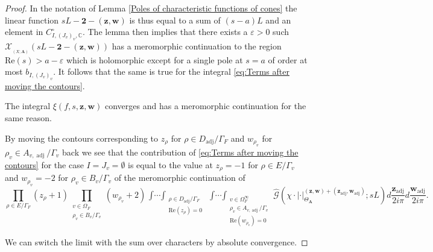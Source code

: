 \documentclass[10pt,a4paper]{amsart}
\DeclareMathOperator{\Eff}{\overline{Eff}}
\DeclareMathOperator{\adj}{adj}
\newcommand{\C}{\mathbb{C}}
\renewcommand{\Re}{\mathrm{Re}}
\begin{document}
\begin{proof}
 	In the notation of Lemma \ref{Poles of characteristic functions of cones} the linear function $s L - \mathbf{2} - (\bm{z}, \bm{w})$ is thus equal to a sum of $(s - a)L$ and an element in $C_{I, (J_v)_v, \C}^{\circ}$. The lemma then implies that there exists a $\varepsilon > 0$ such $\mathcal{X}_{\Eff_{(X; \mathbf{A})}}(s L - \mathbf{2} - (\bm{z}, \bm{w}))$ has a meromorphic continuation to the region $\Re(s) > a - \varepsilon$ which is holomorphic except for a single pole at $s = a$ of order at most $b_{I, (J_v)_v}$. It follows that the same is true for the integral \eqref{eq:Terms after moving the contours}. 
 	
 	The integral $\xi(f, s, \bm{z}, \bm{w})$ converges and has a meromorphic continuation for the same reason.
 	
 	 By moving the contours corresponding to $z_{\rho}$ for $\rho \in D_{\adj}/\Gamma_F$ and $w_{\rho_v}$ for $\rho_v \in A_{v, \adj}/ \Gamma_v$ back we see that the contribution of \eqref{eq:Terms after moving the contours} for the case $I = J_v = \emptyset$ is equal to the value at $z_{\rho} = -1$ for $\rho \in E/\Gamma_v$ and $w_{\rho_v} = -2$ for $\rho_v \in B_v/ \Gamma_v$ of the meromorphic continuation of
 	\[
 	\prod_{\rho \in E / \Gamma_F} (z_{\rho} + 1) \prod_{\substack{v \in \Omega_F \\ \rho_v \in B_v/\Gamma_v}} (w_{\rho_v} + 2)\mathop{\int \cdots \int}_{\substack{\rho \in D_{\adj} / \Gamma_F \\ \Re(z_{\rho}) = 0}}\mathop{\int \cdots \int}_{\substack{v \in \Omega_F^{\infty} \\ \rho_v \in A_{v, \adj} /\Gamma_v \\ \Re(w_{\rho_v}) = 0}} 
 	\hat{\mathcal{G}}(\chi \cdot | \cdot|_{\Theta_{\mathbf{A}}}^{(\bm{z}, \bm{w}) + (\bm{z}_{\adj}, \bm{w}_{\adj})}; s L) d\frac{\bm{z}_{\adj}}{2 i \pi} d \frac{\bm{w}_{\adj}}{2 i \pi}.
 	\] 
 	
 	We can switch the limit with the sum over characters by absolute convergence.
\end{proof}
\end{document}
